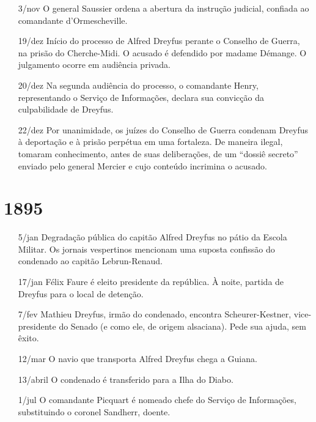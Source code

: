 \begin{itemize}
\item[3/nov] O general Saussier ordena a abertura da instrução judicial,
confiada ao comandante d'Ormescheville.

\item[19/dez] Início do processo de Alfred Dreyfus perante o Conselho de
Guerra, na prisão do Cherche-Midi. O acusado é defendido por madame Démange. O
julgamento ocorre em audiência privada. 

\item[20/dez] Na segunda audiência do processo, o comandante Henry,
representando o Serviço de Informações, declara sua convicção da culpabilidade
de Dreyfus.

\item[22/dez] Por unanimidade, os juízes do Conselho de Guerra condenam Dreyfus
à deportação e à prisão perpétua em uma fortaleza. De maneira ilegal, tomaram
conhecimento, antes de suas deliberações, de um ``dossiê secreto'' enviado pelo
general Mercier e cujo conteúdo incrimina o acusado.
\end{itemize}

\section{1895}
\begin{itemize}
\setlength\itemsep{-1mm}
\item[5/jan] Degradação pública do capitão Alfred Dreyfus no pátio da Escola
Militar. Os jornais vespertinos mencionam uma suposta confissão do condenado ao
capitão Lebrun-Renaud.

\item[17/jan] Félix Faure é eleito presidente da república. À noite, partida de
Dreyfus para o local de detenção.

\item[7/fev] Mathieu Dreyfus, irmão do condenado, encontra Scheurer-Kestner,
vice-presidente do Senado (e como ele, de origem alsaciana). Pede sua ajuda,
sem êxito. 

\item[12/mar] O navio que transporta Alfred Dreyfus chega a Guiana.

\item[13/abril] O condenado é transferido para a Ilha do Diabo.

\item[1/jul] O comandante Picquart é nomeado chefe do Serviço de Informações,
substituindo o coronel Sandherr, doente.
\end{itemize}


